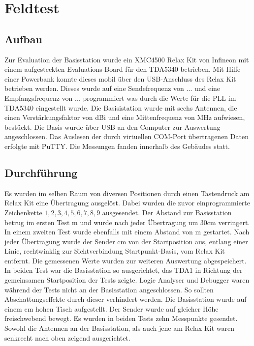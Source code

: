 \chapter{Feldtest}
\label{sec:Feldtest}
\pagestyle{scrheadings}
\section{Aufbau}
Zur Evaluation der Basisstation wurde ein  XMC4500 Relax Kit von Infineon mit einem aufgesteckten Evaluations-Board für den TDA5340 betrieben. Mit Hilfe einer Powerbank konnte dieses mobil über den \ac{USB}-Anschluss des Relax Kit betrieben werden. %
Dieses wurde auf eine Sendefrequenz von $...$ und eine Empfangsfrequenz von $...$ programmiert was durch die Werte für die \ac{PLL} im TDA5340 eingestellt wurde. 
Die Basisistation wurde mit sechs Antennen, die einen Verstärkungsfaktor von \unit[3,6]{dBi} und eine Mittenfrequenz von \unit[868]{MHz} aufwiesen, bestückt. Die Basis wurde über \ac{USB} an den Computer zur Auswertung angeschlossen. Das Auslesen der durch virtuellen COM-Port übertragenen Daten erfolgte mit  PuTTY. Die Messungen fanden innerhalb des Gebäudes statt.


\section{Durchführung}
Es wurden  im selben Raum von diversen Positionen durch einen Tastendruck am Relax Kit eine Übertragung ausgelöst. Dabei wurden die zuvor einprogrammierte Zeichenkette $1,2,3,4,5,6,7,8,9$ ausgesendet. Der Abstand zur Basisstation betrug im ersten Test  \unit[3,30]{m} und wurde nach jeder Übertragung um $30$cm verringert. 
In einem zweiten Test wurde ebenfalls mit einem Abstand von \unit[3,30]{m} gestartet.  Nach jeder Übertragung wurde der Sender \unit[30]{cm}  von der Startposition aus, entlang einer  Linie, rechtwinklig zur Sichtverbindung Startpunkt-Basis, vom Relax Kit entfernt. Die gemessenen Werte wurden zur weiteren Auswertung abgespeichert.
In beiden Test war die Basisstation so ausgerichtet, das TDA1 in Richtung der gemeinsamen Startposition der Tests zeigte. Logic Analyser und Debugger waren während der Tests nicht an der Basisstation angeschlossen. So sollten Abschattungseffekte durch dieser verhindert werden. Die Basisstation wurde auf einem \unit[70]{cm} hohen Tisch aufgestellt. Der Sender wurde auf gleicher Höhe freischwebend bewegt. Es wurden in beiden Tests zehn Messpunkte gesendet. Sowohl die Antennen an der Basisstation, als auch jene am Relax Kit waren senkrecht nach oben zeigend ausgerichtet.


